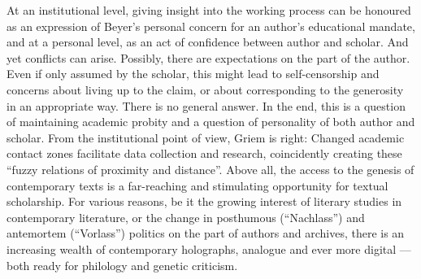 \begin{paper}
At an institutional level, giving insight into the working process can
be honoured as an expression of Beyer's personal concern for an author's
educational mandate, and at a personal level, as an act of confidence
between author and scholar. And yet conflicts can arise. Possibly, there
are expectations on the part of the author. Even if only assumed by
the scholar, this might lead to self-censorship and concerns about living
up to the claim, or about corresponding to the generosity in an appropriate
way. There is no general answer. In the end, this is a question of
maintaining academic probity and a question of personality of both
author and scholar. From the institutional point of view, Griem is
right: Changed academic contact zones facilitate data collection and
research, coincidently creating these ``fuzzy relations of proximity and
distance''. Above all, the access to the genesis of contemporary texts
is a far-reaching and stimulating opportunity for textual scholarship.
For various reasons, be it the growing interest of literary studies in
contemporary literature, or the change in posthumous (``Nachlass'') and
antemortem (``Vorlass'') politics on the part of authors and archives,
there is an increasing wealth of contemporary holographs, analogue and
ever more digital –– both ready for philology and genetic criticism.


\begin{flushleft}
    \renewcommand*{\mkbibnamefamily}[1]{\textsc{#1}}
    \renewcommand*{\mkbibnamegiven}[1]{\textsc{#1}} 
\printbibliography
\end{flushleft}

\end{paper}